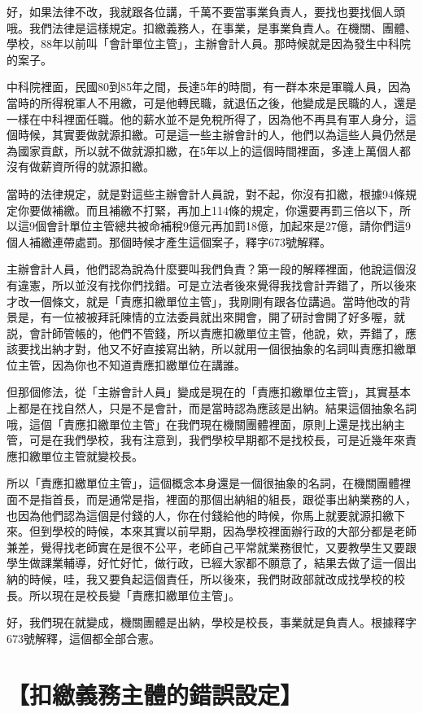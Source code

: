 \documentclass[]{ctexbook}
\begin{document}
好，如果法律不改，我就跟各位講，千萬不要當事業負責人，要找也要找個人頭哦。我們法律是這樣規定。扣繳義務人，在事業，是事業負責人。在機關、團體、學校，88年以前叫「會計單位主管」，主辦會計人員。那時候就是因為發生中科院的案子。

中科院裡面，民國80到85年之間，長達5年的時間，有一群本來是軍職人員，因為當時的所得稅軍人不用繳，可是他轉民職，就退伍之後，他變成是民職的人，還是一樣在中科裡面任職。他的薪水並不是免稅所得了，因為他不再具有軍人身分，這個時候，其實要做就源扣繳。可是這一些主辦會計的人，他們以為這些人員仍然是為國家貢獻，所以就不做就源扣繳，在5年以上的這個時間裡面，多達上萬個人都沒有做薪資所得的就源扣繳。

當時的法律規定，就是對這些主辦會計人員說，對不起，你沒有扣繳，根據94條規定你要做補繳。而且補繳不打緊，再加上114條的規定，你還要再罰三倍以下，所以這9個會計單位主管總共被命補稅9億元再加罰18億，加起來是27億，請你們這9個人補繳連帶處罰。那個時候才產生這個案子，釋字673號解釋。

主辦會計人員，他們認為說為什麼要叫我們負責？第一段的解釋裡面，他說這個沒有違憲，所以並沒有找你們找錯。可是立法者後來覺得我找會計弄錯了，所以後來才改一個條文，就是「責應扣繳單位主管」，我剛剛有跟各位講過。當時他改的背景是，有一位被被拜託陳情的立法委員就出來開會，開了研討會開了好多喔，就説，會計師管帳的，他們不管錢，所以責應扣繳單位主管，他說，欸，弄錯了，應該要找出納才對，他又不好直接寫出納，所以就用一個很抽象的名詞叫責應扣繳單位主管，因為你也不知道責應扣繳單位在講誰。

但那個修法，從「主辦會計人員」變成是現在的「責應扣繳單位主管」，其實基本上都是在找自然人，只是不是會計，而是當時認為應該是出納。結果這個抽象名詞哦，這個「責應扣繳單位主管」在我們現在機關團體裡面，原則上還是找出納主管，可是在我們學校，我有注意到，我們學校早期都不是找校長，可是近幾年來責應扣繳單位主管就變校長。

所以「責應扣繳單位主管」，這個概念本身還是一個很抽象的名詞，在機關團體裡面不是指首長，而是通常是指，裡面的那個出納組的組長，跟從事出納業務的人，也因為他們認為這個是付錢的人，你在付錢給他的時候，你馬上就要就源扣繳下來。但到學校的時候，本來其實以前早期，因為學校裡面辦行政的大部分都是老師兼差，覺得找老師實在是很不公平，老師自己平常就業務很忙，又要教學生又要跟學生做課業輔導，好忙好忙，做行政，已經大家都不願意了，結果去做了這一個出納的時候，哇，我又要負起這個責任，所以後來，我們財政部就改成找學校的校長。所以現在是校長變「責應扣繳單位主管」。

好，我們現在就變成，機關團體是出納，學校是校長，事業就是負責人。根據釋字673號解釋，這個都全部合憲。

\hypertarget{ux6263ux7e73ux7fa9ux52d9ux4e3bux9ad4ux7684ux932fux8aa4ux8a2dux5b9a}{%
\section{【扣繳義務主體的錯誤設定】}\label{ux6263ux7e73ux7fa9ux52d9ux4e3bux9ad4ux7684ux932fux8aa4ux8a2dux5b9a}}
\end{document}
